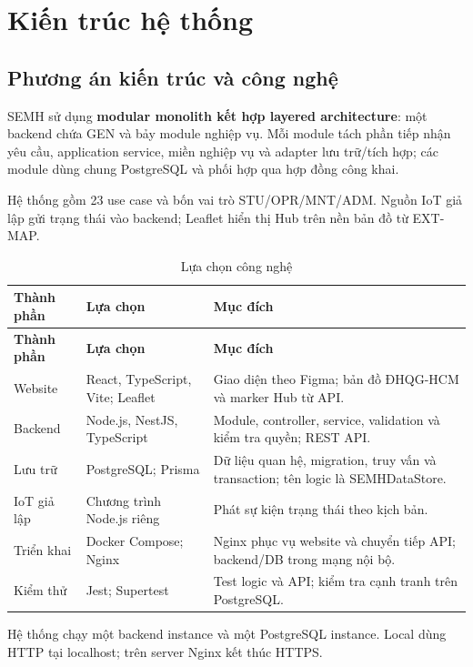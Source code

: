 \section{Kiến trúc hệ thống}
\subsection{Phương án kiến trúc và công nghệ}
SEMH sử dụng \textbf{modular monolith kết hợp layered architecture}: một backend chứa GEN và bảy module nghiệp vụ. Mỗi module tách phần tiếp nhận yêu cầu, application service, miền nghiệp vụ và adapter lưu trữ/tích hợp; các module dùng chung PostgreSQL và phối hợp qua hợp đồng công khai.

Hệ thống gồm 23 use case và bốn vai trò STU/OPR/MNT/ADM. Nguồn IoT giả lập gửi trạng thái vào backend; Leaflet hiển thị Hub trên nền bản đồ từ EXT-MAP.

\begin{longtable}{|L{28mm}|L{43mm}|L{68mm}|}
\caption{Lựa chọn công nghệ}\\\hline
\textbf{Thành phần} & \textbf{Lựa chọn} & \textbf{Mục đích}\\\hline
\endfirsthead
\hline\textbf{Thành phần} & \textbf{Lựa chọn} & \textbf{Mục đích}\\\hline\endhead
Website & React, TypeScript, Vite; Leaflet & Giao diện theo Figma; bản đồ ĐHQG-HCM và marker Hub từ API.\\\hline
Backend & Node.js, NestJS, TypeScript & Module, controller, service, validation và kiểm tra quyền; REST API.\\\hline
Lưu trữ & PostgreSQL; Prisma & Dữ liệu quan hệ, migration, truy vấn và transaction; tên logic là SEMHDataStore.\\\hline
IoT giả lập & Chương trình Node.js riêng & Phát sự kiện trạng thái theo kịch bản.\\\hline
Triển khai & Docker Compose; Nginx & Nginx phục vụ website và chuyển tiếp API; backend/DB trong mạng nội bộ.\\\hline
Kiểm thử & Jest; Supertest & Test logic và API; kiểm tra cạnh tranh trên PostgreSQL.\\\hline
\end{longtable}

Hệ thống chạy một backend instance và một PostgreSQL instance. Local dùng HTTP tại localhost; trên server Nginx kết thúc HTTPS.
